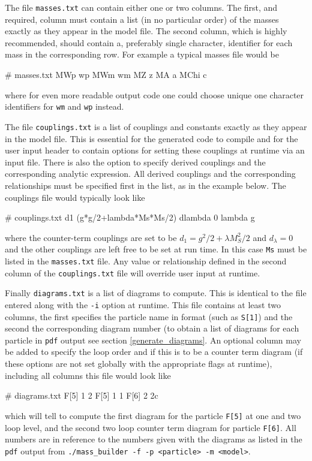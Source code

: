 The file \lstinline{masses.txt} can contain either one or two columns.  The first, and required, column must contain a list (in no particular order) of the masses exactly as they appear in the \feynarts model file.  The second column, which is highly recommended, should contain a, preferably single character, identifier for each mass in the corresponding row.  For example a typical masses file would be
\begin{lstterm}
# masses.txt
MWp          wp
MWm          wm
MZ           z
MA           a
MChi	       c
\end{lstterm}
where for even more readable output code one could choose unique one character identifiers for \lstinline{wm} and \lstinline{wp} instead.

The file \lstinline{couplings.txt} is a list of couplings and constants exactly as they appear in the \feynarts model file.  This is essential for the generated code to compile and for the user input header to contain options for setting these couplings at runtime via an input file.  There is also the option to specify derived couplings and the corresponding analytic expression.  All derived couplings and the corresponding relationships must be specified first in the list, as in the example below.  The couplings file would typically look like
\begin{lstterm}
# couplings.txt
d1 (g*g/2+lambda*Ms*Ms/2)
dlambda 0
lambda
g
\end{lstterm}
where the counter-term couplings are set to be $d_1=g^2/2 + \lambda M_S^2/2$ and $d_{\lambda}=0$ and the other couplings are left free to be set at run time.  In this case \lstinline{Ms} must be listed in the \lstinline{masses.txt} file.  Any value or relationship defined in the second column of the \lstinline{couplings.txt} file will override user input at runtime.

Finally \lstinline{diagrams.txt} is a list of diagrams to compute.  This is identical to the file entered along with the \lstinline{-i} option at runtime.  This file contains at least two columns, the first specifies the particle name in \feynarts format (such as \lstinline{S[1]}) and the second the corresponding diagram number (to obtain a list of diagrams for each particle in \lstinline{pdf} output see section \ref{generate_diagrams}.  An optional column may be added to specify the loop order and if this is to be a counter term diagram (if these options are not set globally with the appropriate flags at runtime), including all columns this file would look like
\begin{lstterm}
# diagrams.txt
F[5]   1   2
F[5]   1   1
F[6]   2   2c
\end{lstterm}
which will tell \mb to compute the first diagram for the particle \lstinline{F[5]} at one and two loop level, and the second two loop counter term diagram for particle \lstinline{F[6]}.  All numbers are in reference to the numbers given with the diagrams as listed in the \lstinline{pdf} output from \lstinline{./mass_builder -f -p <particle> -m <model>}.

